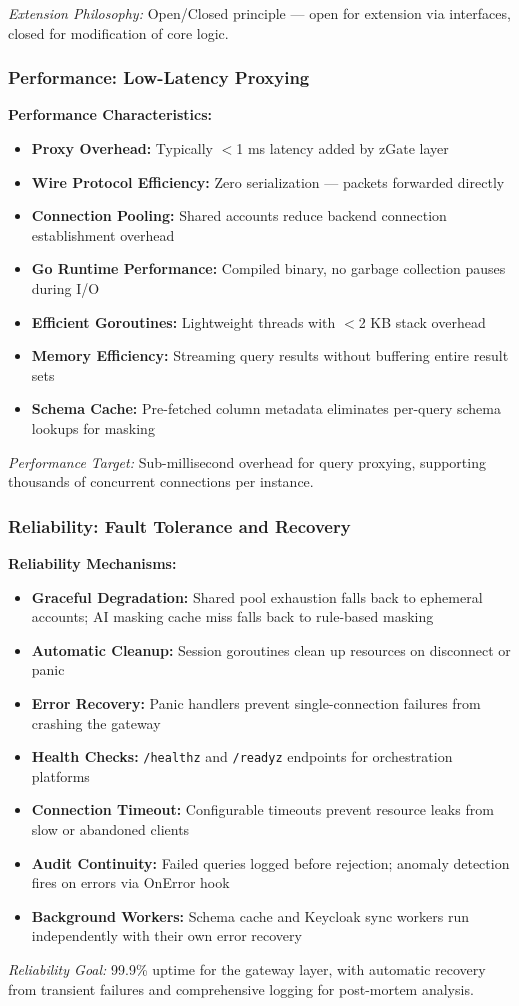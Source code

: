 \textit{Extension Philosophy:} Open/Closed principle — open for extension via interfaces, closed for modification of core logic.

\subsubsection{Performance: Low-Latency Proxying}

\textbf{Performance Characteristics:}
\begin{itemize}[leftmargin=*]
    \item \textbf{Proxy Overhead:} Typically $<$1 ms latency added by zGate layer
    \item \textbf{Wire Protocol Efficiency:} Zero serialization — packets forwarded directly
    \item \textbf{Connection Pooling:} Shared accounts reduce backend connection establishment overhead
    \item \textbf{Go Runtime Performance:} Compiled binary, no garbage collection pauses during I/O
    \item \textbf{Efficient Goroutines:} Lightweight threads with $<$2 KB stack overhead
    \item \textbf{Memory Efficiency:} Streaming query results without buffering entire result sets
    \item \textbf{Schema Cache:} Pre-fetched column metadata eliminates per-query schema lookups for masking
\end{itemize}

\textit{Performance Target:} Sub-millisecond overhead for query proxying, supporting thousands of concurrent connections per instance.

\subsubsection{Reliability: Fault Tolerance and Recovery}

\textbf{Reliability Mechanisms:}
\begin{itemize}[leftmargin=*]
    \item \textbf{Graceful Degradation:} Shared pool exhaustion falls back to ephemeral accounts; AI masking cache miss falls back to rule-based masking
    \item \textbf{Automatic Cleanup:} Session goroutines clean up resources on disconnect or panic
    \item \textbf{Error Recovery:} Panic handlers prevent single-connection failures from crashing the gateway
    \item \textbf{Health Checks:} \texttt{/healthz} and \texttt{/readyz} endpoints for orchestration platforms
    \item \textbf{Connection Timeout:} Configurable timeouts prevent resource leaks from slow or abandoned clients
    \item \textbf{Audit Continuity:} Failed queries logged before rejection; anomaly detection fires on errors via OnError hook
    \item \textbf{Background Workers:} Schema cache and Keycloak sync workers run independently with their own error recovery
\end{itemize}

\textit{Reliability Goal:} 99.9\% uptime for the gateway layer, with automatic recovery from transient failures and comprehensive logging for post-mortem analysis.
